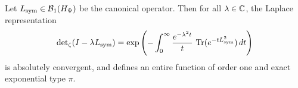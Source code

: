\begin{lemma}
\label{lem:laplace_heat_trace_convergence}
Let \( L_{\mathrm{sym}} \in \mathcal{B}_1(H_{\Psi}) \) be the canonical operator. Then for all \( \lambda \in \mathbb{C} \), the Laplace representation
\begin{equation}
\label{eq:laplace_heat_trace_representation}
\det\nolimits_\zeta(I - \lambda L_{\mathrm{sym}}) = \exp\left( - \int_0^\infty \frac{e^{-\lambda^2 t}}{t} \, \operatorname{Tr}(e^{-t L_{\mathrm{sym}}^2}) \, dt \right)
\end{equation}
is absolutely convergent, and defines an entire function of order one and exact exponential type \( \pi \).
\end{lemma}
